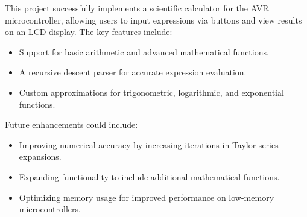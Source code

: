 This project successfully implements a scientific calculator for the AVR microcontroller, allowing users to input expressions via buttons and view results on an LCD display. The key features include:
\begin{itemize}
\item Support for basic arithmetic and advanced mathematical functions.
\item A recursive descent parser for accurate expression evaluation.
\item Custom approximations for trigonometric, logarithmic, and exponential functions.
\end{itemize}

Future enhancements could include:
\begin{itemize}
\item Improving numerical accuracy by increasing iterations in Taylor series expansions.
\item Expanding functionality to include additional mathematical functions.
\item Optimizing memory usage for improved performance on low-memory microcontrollers.
\end{itemize}